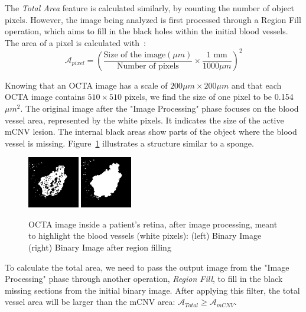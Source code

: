\documentclass[conference]{IEEEtran}
\begin{document}
The \textit{Total Area} feature is calculated similarly, by counting the number of object pixels. However, the image being analyzed is first processed through a Region Fill operation, which aims to fill in the black holes within the initial blood vessels.
The area of a pixel is calculated with~\cite{dougherty2020digital}: %
\begin{equation}
\mathcal{A}_{pixel}=\left( \frac{\text{Size of the image} (\mu m)}{\text{Number of pixels}} \times \frac{1 \text{ mm}}{1000 \mu m} \right)^2
\end{equation}

Knowing that an OCTA image has a scale of $200\mu m \times 200\mu m$ and that each OCTA image contains $510\times510$ pixels, we find the size of one pixel to be 0.154 $\mu m^2$.
The original image after the "Image Processing" phase focuses on the blood vessel area, represented by the white pixels. It indicates the size of the active mCNV lesion. The internal black areas show parts of the object where the blood vessel is missing. Figure~\ref{fig:features} illustrates a structure similar to a sponge.

\begin{figure}%
    \centering
    \includegraphics[width=0.2\textwidth]{fig/vessel.png}
    \includegraphics[width=0.2\textwidth]{fig/total.png}
    \caption{OCTA image inside a patient's retina, after image processing, meant to highlight the blood vessels (white pixels): (left) Binary Image (right) Binary Image after region filling}
    \label{fig:features}
\end{figure}

To calculate the total area, we need to pass the output image from the "Image Processing" phase through another operation, \textit{Region Fill}, to fill in the black missing sections from the initial binary image. After applying this filter, the total vessel area will be larger than the mCNV area:
$
\mathcal{A}_{Total} \geq \mathcal{A}_{mCNV}$.
\end{document}
